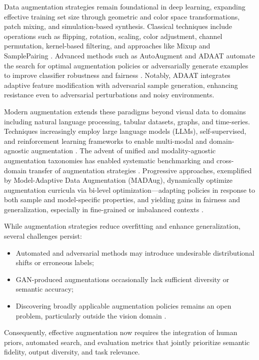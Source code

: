 \documentclass[11pt]{article}
\begin{document}
Data augmentation strategies remain foundational in deep learning, expanding effective training set size through geometric and color space transformations, patch mixing, and simulation-based synthesis. Classical techniques include operations such as flipping, rotation, scaling, color adjustment, channel permutation, kernel-based filtering, and approaches like Mixup and SamplePairing \cite{ref54, ref55, ref61, ref64}. Advanced methods such as AutoAugment and ADAAT automate the search for optimal augmentation policies or adversarially generate examples to improve classifier robustness and fairness \cite{ref66, ref85}. Notably, ADAAT integrates adaptive feature modification with adversarial sample generation, enhancing resistance even to adversarial perturbations and noisy environments.

Modern augmentation extends these paradigms beyond visual data to domains including natural language processing, tabular datasets, graphs, and time-series. Techniques increasingly employ large language models (LLMs), self-supervised, and reinforcement learning frameworks to enable multi-modal and domain-agnostic augmentation \cite{ref1, ref2, ref3, ref5, ref6, ref10, ref12, ref13, ref14, ref15, ref16, ref18, ref21, ref22, ref23, ref24, ref25, ref26, ref29, ref30, ref32, ref60, ref62, ref64, ref65, ref70, ref83}. The advent of unified and modality-agnostic augmentation taxonomies has enabled systematic benchmarking and cross-domain transfer of augmentation strategies \cite{ref60, ref62}. Progressive approaches, exemplified by Model-Adaptive Data Augmentation (MADAug), dynamically optimize augmentation curricula via bi-level optimization—adapting policies in response to both sample and model-specific properties, and yielding gains in fairness and generalization, especially in fine-grained or imbalanced contexts \cite{ref66}.

While augmentation strategies reduce overfitting and enhance generalization, several challenges persist:
\begin{itemize}
    \item Automated and adversarial methods may introduce undesirable distributional shifts or erroneous labels;
    \item GAN-produced augmentations occasionally lack sufficient diversity or semantic accuracy;
    \item Discovering broadly applicable augmentation policies remains an open problem, particularly outside the vision domain \cite{ref62, ref66, ref85}.
\end{itemize}
Consequently, effective augmentation now requires the integration of human priors, automated search, and evaluation metrics that jointly prioritize semantic fidelity, output diversity, and task relevance.
\end{document}
